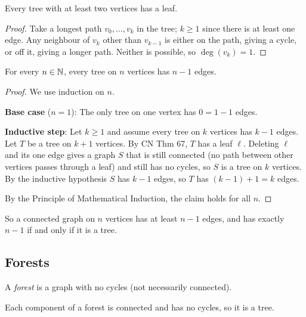 \bigskip
\begin{theorem}[CN Thm 67]
Every tree with at least two vertices has a leaf.
\end{theorem}
\begin{proof}
Take a longest path $v_0,\dots,v_k$ in the tree; $k\ge1$ since there is at least one edge. Any neighbour of $v_k$ other than $v_{k-1}$ is either on the path, giving a cycle, or off it, giving a longer path. Neither is possible, so $\deg(v_k)=1$.
\end{proof}

\begin{theorem}[CN Thm 68]
For every $n\in\mathbb{N}$, every tree on $n$ vertices has $n-1$ edges.
\end{theorem}
\begin{proof}
We use induction on $n$.

\textbf{Base case} ($n=1$): The only tree on one vertex has $0=1-1$ edges.

\textbf{Inductive step}: Let $k\ge1$ and assume every tree on $k$ vertices has $k-1$ edges. Let $T$ be a tree on $k+1$ vertices. By CN Thm 67, $T$ has a leaf $\ell$. Deleting $\ell$ and its one edge gives a graph $S$ that is still connected (no path between other vertices passes through a leaf) and still has no cycles, so $S$ is a tree on $k$ vertices. By the inductive hypothesis $S$ has $k-1$ edges, so $T$ has $(k-1)+1=k$ edges.

By the Principle of Mathematical Induction, the claim holds for all $n$.
\end{proof}

\begin{note}
So a connected graph on $n$ vertices has at least $n-1$ edges, and has exactly $n-1$ if and only if it is a tree.
\end{note}

\subsection{Forests}
\label{sec:12-3}

\begin{definition}[Forest]
A \emph{forest} is a graph with no cycles (not necessarily connected).
\end{definition}

\begin{note}
Each component of a forest is connected and has no cycles, so it is a tree.
\end{note}

